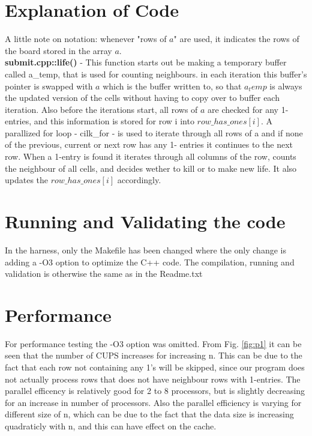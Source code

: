 \newcommand{\figurepath}{./figures/}
\newcommand{\figurescale}{0.45}
\newcommand{\codepath}{../matlab/}

\section*{Explanation of Code}
A little note on notation: whenever "rows of $a$" are used, it indicates the rows of the board stored in the array $a$. \\
\textbf{submit.cpp::life()} - This function starts out be making a temporary buffer called a_temp, that is used for counting neighbours. in each iteration this buffer's pointer is swapped with $a$ which is the buffer written to, so that $a_temp$ is always the updated version of the cells without having to copy over to buffer each iteration.
Also before the iterations start, all rows of $a$ are checked for any 1-entries, and this information is stored for row i into $row\_has\_ones[i]$.
A parallized for loop - cilk_for - is used to iterate through all rows of a and if none of the previous, current or next row has any 1- entries it continues to the next row. When a 1-entry is found it iterates through all columns of the row, counts the neighbour of all cells, and decides wether to kill or to make new life. It also updates the $row\_has\_ones[i]$ accordingly.

\section*{Running and Validating the code}
In the harness, only the Makefile has been changed where the only change is adding a -O3 option to optimize the C++ code. 
The compilation, running and validation is otherwise the same as in the Readme.txt

\section*{Performance}
For performance testing the -O3 option was omitted. From Fig. \ref{fig:p1} it can be seen that the number of CUPS increases for increasing n. This can be due to the fact that each row not containing any 1's will be skipped, since our program does not actually process rows that does not have neighbour rows with 1-entries. The parallel efficency is relatively good for 2 to 8 processors, but is slightly decreasing for an increase in number of processors. Also the parallel efficiency is varying for different size of n, which can be due to the fact that the data size is increasing quadraticly with n, and this can have effect on the cache. 

